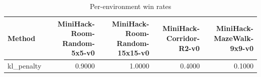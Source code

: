 \begin{table}[htbp]
\centering
\caption{Per-environment win rates}
\label{tab:per-env}
\begin{tabular}{lrrrr}
\toprule
\textbf{Method} & \textbf{MiniHack-Room-Random-5x5-v0} & \textbf{MiniHack-Room-Random-15x15-v0} & \textbf{MiniHack-Corridor-R2-v0} & \textbf{MiniHack-MazeWalk-9x9-v0} \\
\midrule
kl\_penalty & 0.9000 & 1.0000 & 0.4000 & 0.1000 \\
\bottomrule
\end{tabular}
\end{table}